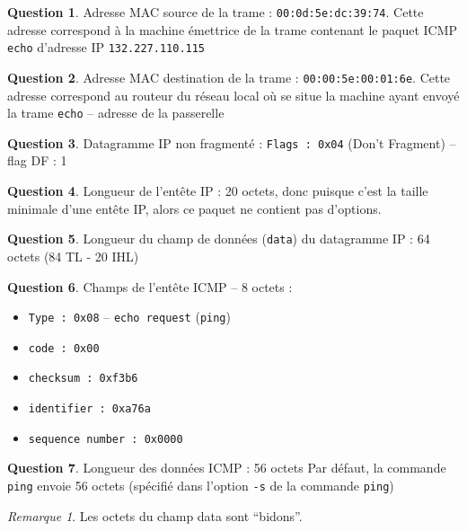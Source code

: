 \documentclass[11pt,english,french]{scrreprt}
\theoremstyle{remark}
\newtheorem*{rem*}{Remarque}
\theoremstyle{definition}
\newtheorem{ques*}{Question}[subsection]
\begin{document}
\begin{ques*}
	Adresse MAC source de la trame : \lstinline!00:0d:5e:dc:39:74!. Cette adresse correspond à la machine émettrice de la trame contenant le paquet ICMP \lstinline!echo! d'adresse IP \lstinline!132.227.110.115!
\end{ques*}

\begin{ques*}
	Adresse MAC destination de la trame : \lstinline!00:00:5e:00:01:6e!. Cette adresse correspond au routeur du réseau local où se situe la machine ayant envoyé la trame \lstinline!echo! -- adresse de la passerelle
\end{ques*}

\begin{ques*}
 	Datagramme IP non fragmenté : \lstinline!Flags : 0x04! (Don't Fragment) -- flag DF : 1
\end{ques*}

\begin{ques*}
	Longueur de l'entête IP : 20 octets, donc puisque c'est la taille minimale d'une entête IP, alors ce paquet ne contient pas d'options.
\end{ques*}

\begin{ques*}
	Longueur du champ de données (\lstinline!data!) du datagramme IP : 64 octets (84 TL - 20 IHL)
\end{ques*}

\begin{ques*}
	Champs de l'entête ICMP -- 8 octets :\begin{itemize}
		\item \lstinline!Type : 0x08! -- \lstinline!echo request! (\lstinline!ping!)
		\item \lstinline!code : 0x00!
		\item \lstinline!checksum : 0xf3b6!
		\item \lstinline!identifier : 0xa76a!
		\item \lstinline!sequence number : 0x0000!
	\end{itemize}
\end{ques*}

\begin{ques*}
	Longueur des données ICMP : 56 octets
	Par défaut, la commande \lstinline!ping! envoie 56 octets (spécifié dans l'option \lstinline!-s! de la commande \lstinline!ping!)
	\begin{rem*}
		Les octets du champ data sont ``bidons''.
	\end{rem*}
\end{ques*}
\end{document}
